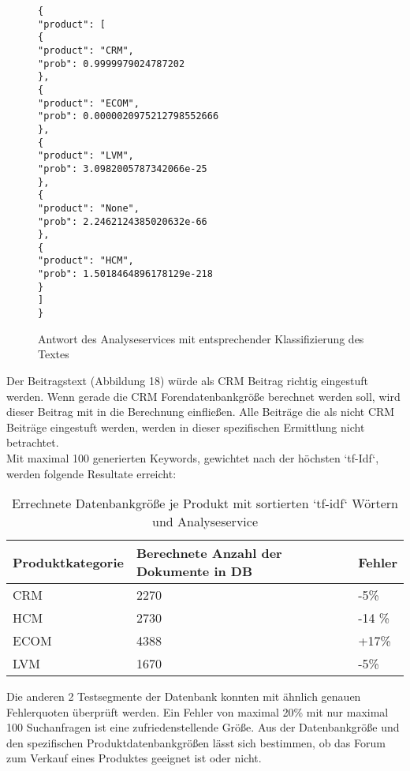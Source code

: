 \newpage

\begin{figure}[h!]
\begin{lstlisting}[language=HTML5]
{
"product": [
{
"product": "CRM",
"prob": 0.9999979024787202
},
{
"product": "ECOM",
"prob": 0.0000020975212798552666
},
{
"product": "LVM",
"prob": 3.0982005787342066e-25
},
{
"product": "None",
"prob": 2.2462124385020632e-66
},
{
"product": "HCM",
"prob": 1.5018464896178129e-218
}
]
}
\end{lstlisting}
\caption{Antwort des Analyseservices mit entsprechender Klassifizierung des Textes}
\end{figure}

Der Beitragstext (Abbildung 18) würde als CRM Beitrag richtig eingestuft werden. Wenn gerade die CRM Forendatenbankgröße berechnet werden soll, wird dieser Beitrag mit in die Berechnung einfließen. Alle Beiträge die als nicht CRM Beiträge eingestuft werden, werden in dieser spezifischen Ermittlung nicht betrachtet.\\
Mit maximal 100 generierten Keywords, gewichtet nach der höchsten `tf-Idf`, werden folgende Resultate erreicht:

\begin{table}[h!]
\begin{tabular}{ | p{3cm} | l | l |}
\hline
Produktkategorie & Berechnete Anzahl der Dokumente in DB & Fehler \\ \hline
CRM & 2270 & -5\% \\ \hline
HCM & 2730 & -14 \% \\ \hline
ECOM & 4388 & +17\% \\ \hline
LVM & 1670 & -5\% \\ \hline
\end{tabular}
\caption{Errechnete Datenbankgröße je Produkt mit sortierten `tf-idf` Wörtern und Analyseservice}
\end{table}

Die anderen 2 Testsegmente der Datenbank konnten mit ähnlich genauen Fehlerquoten überprüft werden.
Ein Fehler von maximal 20\% mit nur maximal 100 Suchanfragen ist eine zufriedenstellende Größe. Aus der Datenbankgröße und den spezifischen Produktdatenbankgrößen lässt sich bestimmen, ob das Forum zum Verkauf eines Produktes geeignet ist oder nicht.
